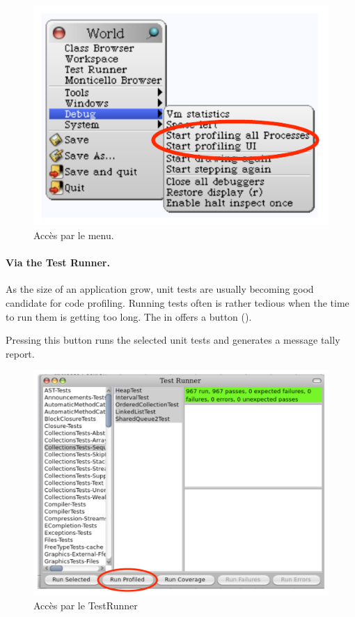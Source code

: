\documentclass[a4paper,10pt,twoside]{book}
\begin{document}
\begin{figure}[h]
	\begin{center}
	\includegraphics[width=.6\linewidth]{menu}
	\caption{Acc\`es par le menu.}
	\end{center}
\end{figure}



\paragraph{Via the Test Runner.}
As the size of an application grow, unit tests are usually becoming good candidate for code profiling. Running tests often is rather tedious when the time to run them is getting too long. The  in \pharo offers a button  (). 

Pressing this button runs the selected unit tests and generates a message tally report. 

\begin{figure}[h]
	\begin{center}
	\includegraphics[width=.8\linewidth]{testRunner}
	\caption{Acc\`es par le TestRunner}
	\end{center}
\end{figure}
\end{document}
